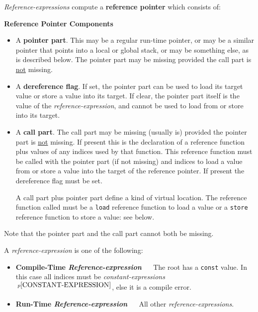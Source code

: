 \documentclass[12pt]{article}
\newcommand{\key}[1]{{\rm \bfseries #1}}
\newcommand{\pagnote}[1]{$\,^{p\pageref{#1}}$}
\begin{document}
{\em Reference-expressions} compute a
\key{reference pointer} which consists of:

\bigskip

\centerline{\bf Reference Pointer Components}\label{REFERENCE-POINTER}
\begin{itemize}
\item A \key{pointer part}.
This may be a regular run-time pointer, or may be a similar pointer that
points into a local or global
stack, or may be something else, as is described below.
The pointer part may be missing provided the call part is \underline{not}
missing.
\item A \key{dereference flag}.  If set, the pointer part
can be used to load its target value or store a value into its target.
If clear, the pointer part
itself is the value of the {\em reference-expression}, and cannot
be used to load from or store into its target.
\item A \key{call part}.
The call part may be missing (usually is) provided the pointer part
is \underline{not} missing.
If present
this is the declaration of a reference function plus values of any
indices used by that function.  This reference function must be called with
the pointer part (if not missing) and indices to 
load a value from or store a value into the target of the reference pointer.
If present the dereference flag must be set.

A call part plus pointer part define a kind of virtual
location.  The reference function called must be a {\tt load}
reference function to load a value or a
{\tt store} reference function to store a value: see below.
\end{itemize}

Note that the pointer part and the call part cannot both be missing.

A {\em reference-expression} is one of the following:
\begin{itemize}
\item \key{Compile-Time {\em Reference-expression}} ~~
The root has a {\tt const} value.  In this
case all indices must be
{\em constant-expressions}\pagnote{CONSTANT-EXPRESSION}, else it is
a compile error.
\item \key{Run-Time {\em Reference-expression}} ~~
All other {\em reference-expressions}.
\end{itemize}
\end{document}
